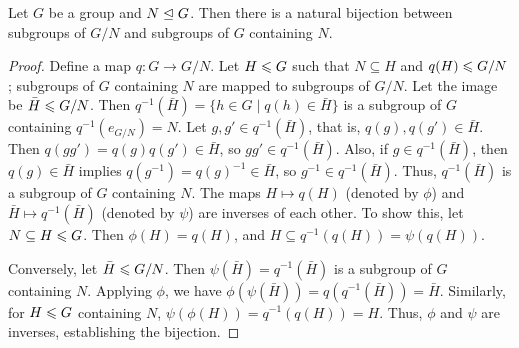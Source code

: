 \begin{proposition}
    Let $G$ be a group and $N \trianglelefteq G$. Then there is a natural bijection between subgroups of $G/N$ and subgroups of $G$ containing $N$.
\end{proposition}
\begin{proof}
    Define a map $q:G \to G/N$. Let $H \leqslant G$ such that $N \subseteq H$ and $q(H) \leqslant G/N$; subgroups of $G$ containing $N$ are mapped to subgroups of $G/N$. Let the image be $\bar{H} \leqslant G/N$. Then $q^{-1}(\bar{H}) = \{h \in G \mid q(h) \in \bar{H}\}$ is a subgroup of $G$ containing $q^{-1}(e_{G/N}) = N$. Let $g, g' \in q^{-1}(\bar{H})$, that is, $q(g), q(g') \in \bar{H}$. Then $q(gg') = q(g)q(g') \in \bar{H}$, so $gg' \in q^{-1}(\bar{H})$. Also, if $g \in q^{-1}(\bar{H})$, then $q(g) \in \bar{H}$ implies $q(g^{-1}) = q(g)^{-1} \in \bar{H}$, so $g^{-1} \in q^{-1}(\bar{H})$. Thus, $q^{-1}(\bar{H})$ is a subgroup of $G$ containing $N$. The maps $H \mapsto q(H)$ (denoted by $\phi$) and $\bar{H} \mapsto q^{-1}(\bar{H})$ (denoted by $\psi$) are inverses of each other. To show this, let $N \subseteq H \leqslant G$. Then $\phi(H) = q(H)$, and $H \subseteq q^{-1}(q(H)) = \psi(q(H))$. 

    Conversely, let $\bar{H} \leqslant G/N$. Then $\psi(\bar{H}) = q^{-1}(\bar{H})$ is a subgroup of $G$ containing $N$. Applying $\phi$, we have $\phi(\psi(\bar{H})) = q(q^{-1}(\bar{H})) = \bar{H}$. Similarly, for $H \leqslant G$ containing $N$, $\psi(\phi(H)) = q^{-1}(q(H)) = H$. Thus, $\phi$ and $\psi$ are inverses, establishing the bijection.
\end{proof}


